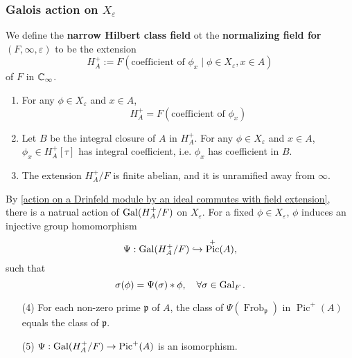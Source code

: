 \documentclass{article}
\DeclareMathOperator{\pic}{Pic}
\DeclareMathOperator{\frob}{Frob}
\begin{document}
\subsubsection{Galois action on \texorpdfstring{$X_\varepsilon$}{Xepsilon}}
We define the \textbf{narrow Hilbert class field} ot the \textbf{normalizing field for $(F, \infty, \varepsilon)$} to be the extension \[H_A^+ := F\left( \text{coefficient of }\phi_x\mid \phi\in X_\varepsilon, x\in A \right)\]
of $F$ in $\mathbb{C}_\infty$.

\begin{theorem}\label{property of HA+}
\begin{enumerate}[(1)]
    \item For any $\phi\in X_\varepsilon$ and $x\in A$,
    \[H_A^+ = F\left( \text{coefficient of }\phi_x \right)\]
    \item Let $B$ be the integral closure of $A$ in $H_A^+$.
    For any $\phi\in X_\varepsilon$ and $x\in A$, $\phi_x\in H_A^+[\tau]$ has integral coefficient, i.e. $\phi_x$ has coefficient in $B$.
    \item The extension $H_A^+/F$ is finite abelian, and it is unramified away from $\infty$.
\end{enumerate}
By \cref{action on a Drinfeld module by an ideal commutes with field extension},
there is a natrual action of $\operatorname{Gal}(H_A^+/F)$ on $X_\varepsilon$.
For a fixed $\phi\in X_\varepsilon$,
$\phi$ induces an injective group homomorphism
\[\Psi : \gal(H_A^+/F)\inject \pic^+(A),\]
such that \[\sigma(\phi) = \Psi(\sigma) * \phi,\quad \forall\sigma\in\operatorname{Gal}_F.\]
\begin{enumerate}[(1)]
    \item[(4)] For each non-zero prime $\mathfrak{p}$ of $A$,
    the class of $\Psi(\frob_\mathfrak{p})$ in $\pic^+(A)$ equals the class of $\mathfrak{p}$.
    \item[(5)] $\Psi : \gal(H_A^+/F)\to \pic^+(A)$ is an isomorphism.
\end{enumerate}

\end{theorem}


\end{document}

